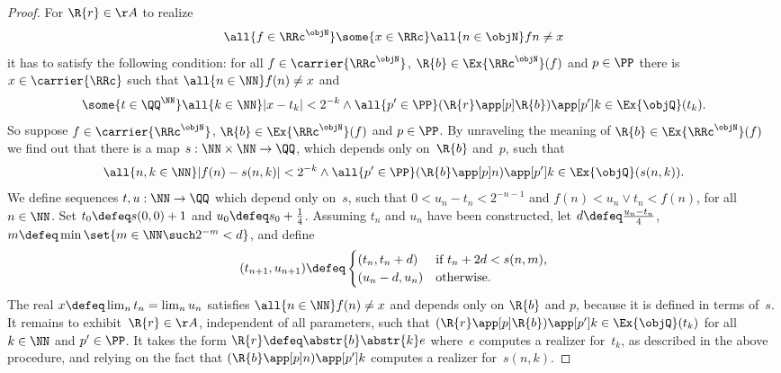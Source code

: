 \begin{proof}
  For $\R{r} \in \AA$ to realize
  \begin{equation*}
    \all{f \in \RRc^\objN}
    \some{x \in \RRc}
    \all{n \in \objN}
    f n \neq x
  \end{equation*}
  it has to satisfy the following condition:
  for all $f \in \carrier{\RRc^\objN}$, $\R{b} \in \Ex{\RRc^\objN}(f)$ and $p \in \PP$
  there is $x \in \carrier{\RRc}$ such that $\all{n \in \NN} f(n) \neq x$ and
  \begin{equation*}
    \some{t \in \QQ^\NN}
    \all{k \in \NN}
    |x - t_k| < 2^{-k}
    \land
    \all{p' \in \PP} (\R{r} \app[p] \R{b}) \app[p'] k \in \Ex{\objQ}(t_k).
  \end{equation*}
  So suppose $f \in \carrier{\RRc^\objN}$, $\R{b} \in \Ex{\RRc^\objN}(f)$ and $p \in \PP$.
  By unraveling the meaning of $\R{b} \in \Ex{\RRc^\objN}(f)$ we find out that
  there is a map $s : \NN \times \NN \to \QQ$, which depends only on~$\R{b}$ and~$p$,
  such that
  \begin{equation*}
    \all{n, k \in \NN}
    |f(n) - s(n, k)| < 2^{-k}
    \land
    \all{p' \in \PP}
    (\R{b} \app[p] n) \app[p'] k \in \Ex{\objQ}(s(n, k)).
  \end{equation*}
  We define sequences $t, u : \NN \to \QQ$ which depend only on~$s$, such that $0 < u_n - t_n < 2^{-n-1}$ and $f(n) < u_n \lor t_n < f(n)$, for all $n \in \NN$. Set $t_0 \defeq s(0,0) + 1$ and $u_0 \defeq s_0 + \frac{1}{4}$.
  Assuming $t_n$ and $u_n$ have been constructed, let $d \defeq \frac{u_n - t_n}{4}$, $m \defeq \min \set{m \in \NN \such 2^{-m} < d}$, and define
  \begin{equation*}
    (t_{n+1}, u_{n+1}) \defeq
    \begin{cases}
      (t_n, t_n + d) &\text{if $t_n + 2 d < s(n, m)$,} \\
      (u_n - d, u_n) &\text{otherwise.}
    \end{cases}
  \end{equation*}
  The real $x \defeq \lim_n t_n = \lim_n u_n$ satisfies $\all{n \in \NN} f(n) \neq x$ and
  depends only on $\R{b}$ and $p$, because it is defined in terms of~$s$.
  It remains to exhibit~$\R{r} \in \AA$, independent of all parameters, such that $(\R{r} \app[p] \R{b}) \app[p'] k \in \Ex{\objQ}(t_k)$ for all $k \in \NN$ and $p' \in \PP$. It takes the form $\R{r} \defeq \abstr{b} \abstr{k} e$ where~$e$ computes a realizer for~$t_k$, as described in the above procedure, and relying on the fact that $(\R{b} \app[p] n) \app[p'] k$ computes a realizer for~$s(n, k)$.
\end{proof}

